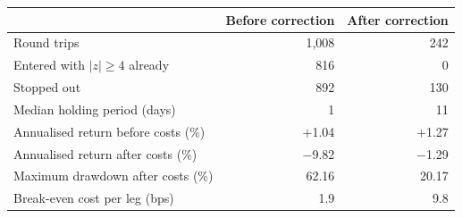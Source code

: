 \begin{tabular}{@{}lrr@{}}
\toprule
 & Before correction & After correction \\
\midrule
Round trips & 1,008 & 242 \\
Entered with $|z| \ge 4$ already & 816 & 0 \\
Stopped out & 892 & 130 \\
Median holding period (days) & 1 & 11 \\
Annualised return before costs (\%) & $+$1.04 & $+$1.27 \\
Annualised return after costs (\%) & $-$9.82 & $-$1.29 \\
Maximum drawdown after costs (\%) & 62.16 & 20.17 \\
Break-even cost per leg (bps) & 1.9 & 9.8 \\
\bottomrule
\end{tabular}
